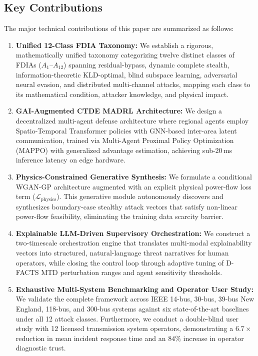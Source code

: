 \documentclass[journal,compsoc]{IEEEtran}
\begin{document}
\subsection{Key Contributions}
The major technical contributions of this paper are summarized as follows:
\begin{enumerate}
    \item \textbf{Unified 12-Class FDIA Taxonomy:} We establish a rigorous, mathematically unified taxonomy categorizing twelve distinct classes of FDIAs ($A_1$--$A_{12}$) spanning residual-bypass, dynamic complete stealth, information-theoretic KLD-optimal, blind subspace learning, adversarial neural evasion, and distributed multi-channel attacks, mapping each class to its mathematical condition, attacker knowledge, and physical impact.
    \item \textbf{GAI-Augmented CTDE MADRL Architecture:} We design a decentralized multi-agent defense architecture where regional agents employ Spatio-Temporal Transformer policies with GNN-based inter-area latent communication, trained via Multi-Agent Proximal Policy Optimization (MAPPO) with generalized advantage estimation, achieving sub-20\,ms inference latency on edge hardware.
    \item \textbf{Physics-Constrained Generative Synthesis:} We formulate a conditional WGAN-GP architecture augmented with an explicit physical power-flow loss term ($\mathcal{L}_{\text{physics}}$). This generative module autonomously discovers and synthesizes boundary-case stealthy attack vectors that satisfy non-linear power-flow feasibility, eliminating the training data scarcity barrier.
    \item \textbf{Explainable LLM-Driven Supervisory Orchestration:} We construct a two-timescale orchestration engine that translates multi-modal explainability vectors into structured, natural-language threat narratives for human operators, while closing the control loop through adaptive tuning of D-FACTS MTD perturbation ranges and agent sensitivity thresholds.
    \item \textbf{Exhaustive Multi-System Benchmarking and Operator User Study:} We validate the complete framework across IEEE 14-bus, 30-bus, 39-bus New England, 118-bus, and 300-bus systems against six state-of-the-art baselines under all 12 attack classes. Furthermore, we conduct a double-blind user study with 12 licensed transmission system operators, demonstrating a $6.7\times$ reduction in mean incident response time and an $84\%$ increase in operator diagnostic trust.
\end{enumerate}
\end{document}
